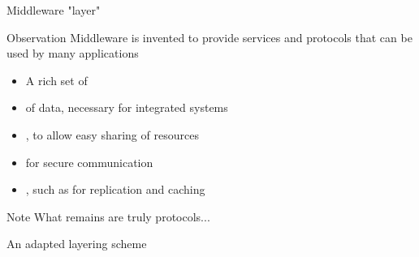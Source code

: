 \begin{slide}{Middleware "layer"}
  \begin{block}{Observation} 
    Middleware is invented to provide  services and protocols that can be used by many
     applications
    \begin{itemize}\tightlist
    \item A rich set of 
    \item {} of data, necessary for integrated systems
    \item {}, to allow easy sharing of resources
    \item {} for secure communication
    \item {}, such as for replication and caching
    \end{itemize}
  \end{block}
  \begin{alertblock}{Note} 
    What remains are truly  protocols... 
  \end{alertblock}
\end{slide}
\begin{slide}{An adapted layering scheme}
  \begin{block}{}
    \begin{center}
    \end{center}
  \end{block}
\end{slide}
